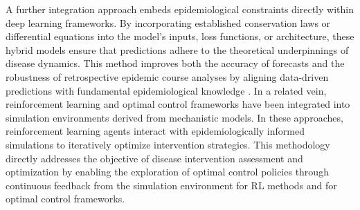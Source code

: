 A further integration approach embeds epidemiological constraints directly within deep learning frameworks. By incorporating established conservation laws or differential equations into the model’s inputs, loss functions, or architecture, these hybrid models ensure that predictions adhere to the theoretical underpinnings of disease dynamics. This method improves both the accuracy of forecasts and the robustness of retrospective epidemic course analyses by aligning data-driven predictions with fundamental epidemiological knowledge \cite{kharazmi_identifiability_2021,barmparis_physicsinformed_2022,de_rosa_modelling_2023,torku_seinn_2023,berkhahn_physics-informed_2022,rodriguez_einns_2023,shaier_data-driven_2022,bertaglia_asymptotic-preserving_2022,malinzi_determining_2022}. In a related vein, reinforcement learning and optimal control frameworks have been integrated into simulation environments derived from mechanistic models. In these approaches, reinforcement learning agents interact with epidemiologically informed simulations to iteratively optimize intervention strategies. This methodology directly addresses the objective of disease intervention assessment and optimization by enabling the exploration of optimal control policies through continuous feedback from the simulation environment \cite{yao_optimal_2023,zou_data-efficient_2021,vereshchaka_optimization_2021,song_reinforced_2020,probert_context_2019,ohi_exploring_2020,khadilkar_optimising_2020,hao_reinforcement_2022,libin_deep_2021,awasthi_vacsim_2022,song_robust_2023,padmanabhan_reinforcement_2021,kompella_reinforcement_2020,mai_planning_2023,asikis_neural_2022,roy_knowledge_2021,colas_epidemioptim_2021,capobianco_agent-based_2021,ou_active_2021,trad_towards_2022,bushaj_simulation-deep_2022,chadi_2022,guo_pacar_2022,kulkarni_optimizing_2022,deng_optimal_2021,hwang_optimal_2022,wan_multi-objective_2022,miralles-pechuan_methodology_2020,bampa_epidrlearn_2022,shami_economic_2022,du_district-coupled_2022,benalcazar_deep_2021,xia_controlling_2022,khatami_reinforcement_2021,zong_reinforcement_2022,du_hrl4ec_2023,nguyen_general_2022,beigi_application_2021} for RL methods and \cite{yin_optimal_2023,asikis_neural_2022,courtes_reduced_2024,li_robust_2021,kmet_neural_2023,kmet_bezier_2019} for optimal control frameworks.

